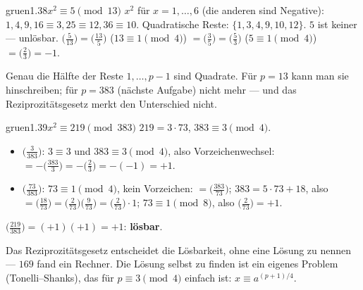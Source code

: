 \begin{loesungkarte}{gruen}{1.38}{$x^{2}\equiv5\pmod{13}$}
$x^{2}$ für $x = 1, \dots, 6$ (die anderen sind Negative): $1, 4, 9, 16\equiv3, 25\equiv12, 36\equiv10$. Quadratische Reste: $\{1, 3, 4, 9, 10, 12\}$. $5$ ist keiner --- unlösbar.
$\bigl(\frac5{13}\bigr) = \bigl(\frac{13}5\bigr)$ ($13\equiv1\pmod4$) $= \bigl(\frac35\bigr) = \bigl(\frac53\bigr)$ ($5\equiv1\pmod4$) $= \bigl(\frac23\bigr) = -1$. \checkmark
\begin{mitnehmen}\kastentext
Genau die Hälfte der Reste $1, \dots, p - 1$ sind Quadrate. Für $p = 13$ kann man sie hinschreiben; für $p = 383$ (nächste Aufgabe) nicht mehr --- und das Reziprozitätsgesetz merkt den Unterschied nicht.
\end{mitnehmen}
\end{loesungkarte}

\begin{loesungkarte}{gruen}{1.39}{$x^{2}\equiv219\pmod{383}$}
$219 = 3\cdot73$, $383\equiv3\pmod4$.
\begin{itemize}[leftmargin=1.2em,itemsep=1pt]
\item $\bigl(\frac3{383}\bigr)$: $3\equiv3$ und $383\equiv3\pmod4$, also Vorzeichenwechsel: $= -\bigl(\frac{383}3\bigr) = -\bigl(\frac23\bigr) = -(-1) = +1$.
\item $\bigl(\frac{73}{383}\bigr)$: $73\equiv1\pmod4$, kein Vorzeichen: $= \bigl(\frac{383}{73}\bigr)$; $383 = 5\cdot73 + 18$, also $= \bigl(\frac{18}{73}\bigr) = \bigl(\frac2{73}\bigr)\bigl(\frac{9}{73}\bigr) = \bigl(\frac2{73}\bigr)\cdot1$; $73\equiv1\pmod8$, also $\bigl(\frac2{73}\bigr) = +1$.
\end{itemize}
$\bigl(\frac{219}{383}\bigr) = (+1)(+1) = +1$: \textbf{lösbar}.
\begin{mitnehmen}\kastentext
Das Reziprozitätsgesetz entscheidet die Lösbarkeit, ohne eine Lösung zu nennen --- $169$ fand ein Rechner. Die Lösung selbst zu finden ist ein eigenes Problem (Tonelli--Shanks), das für $p\equiv3\pmod4$ einfach ist: $x\equiv a^{(p+1)/4}$.
\end{mitnehmen}
\end{loesungkarte}

